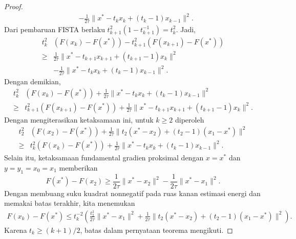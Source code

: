 \begin{proof}
\begin{equation}
\begin{aligned}
            &-\frac{1}{2\tau}
            \|x^*-t_kx_k+(t_k-1)x_{k-1}\|^2.
        \end{aligned}
    \end{equation}
    Dari pembaruan FISTA berlaku \(t_{k+1}^2(1-t_{k+1}^{-1})=t_k^2\). Jadi,
    \begin{equation}
        \begin{aligned}
            t_k^2&(F(x_k)-F(x^*))
            -t_{k+1}^2(F(x_{k+1})-F(x^*))\\
            \geq{}&
            \frac{1}{2\tau}
            \|x^*-t_{k+1}x_{k+1}+(t_{k+1}-1)x_k\|^2\\
            &-\frac{1}{2\tau}
            \|x^*-t_kx_k+(t_k-1)x_{k-1}\|^2.
        \end{aligned}
    \end{equation}
    Dengan demikian,
    \begin{equation}
        \begin{aligned}
            t_k^2&(F(x_k)-F(x^*))
            +\frac{1}{2\tau}
            \|x^*-t_kx_k+(t_k-1)x_{k-1}\|^2\\
            \geq{}&
            t_{k+1}^2(F(x_{k+1})-F(x^*))
            +\frac{1}{2\tau}
            \|x^*-t_{k+1}x_{k+1}+(t_{k+1}-1)x_k\|^2.
        \end{aligned}
    \end{equation}
    Dengan mengiterasikan ketaksamaan ini, untuk \(k\geq2\) diperoleh
    \begin{equation}
        \begin{aligned}
            t_2^2&(F(x_2)-F(x^*))
            +\frac{1}{2\tau}
            \|t_2(x^*-x_2)+(t_2-1)(x_1-x^*)\|^2\\
            \geq{}&
            t_k^2(F(x_k)-F(x^*))
            +\frac{1}{2\tau}
            \|x^*-t_kx_k+(t_k-1)x_{k-1}\|^2.
        \end{aligned}
    \end{equation}
    Selain itu, ketaksamaan fundamental gradien proksimal dengan \(x=x^*\) dan \(y=y_1=x_0=x_1\) memberikan
    \begin{equation}
        F(x^*)-F(x_2)
        \geq\frac{1}{2\tau}\|x^*-x_2\|^2
        -\frac{1}{2\tau}\|x^*-x_1\|^2.
    \end{equation}
    Dengan membuang suku kuadrat nonnegatif pada ruas kanan estimasi energi dan memakai batas terakhir, kita menemukan
    \begin{equation}
        \begin{aligned}
            F(x_k)-F(x^*)
            \leq t_k^{-2}\left(
            \frac{t_2^2}{2\tau}\|x^*-x_1\|^2
            +\frac{1}{2\tau}
            \|t_2(x^*-x_2)+(t_2-1)(x_1-x^*)\|^2
            \right).
        \end{aligned}
    \end{equation}
    Karena \(t_k\geq(k+1)/2\), batas dalam pernyataan teorema mengikuti.
\end{proof}
